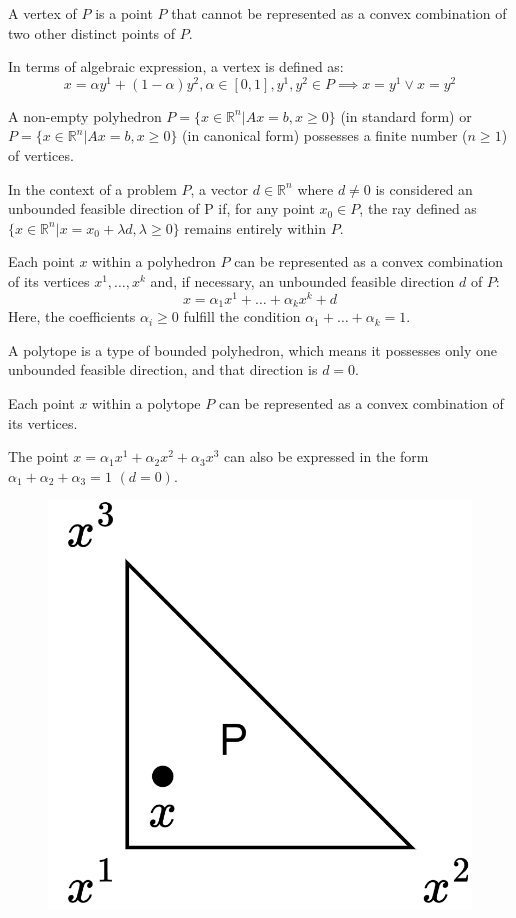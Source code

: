 \begin{definition}
    A vertex of $P$ is a point $P$ that cannot be represented as a convex combination of two other distinct points of $P$. 
\end{definition}
In terms of algebraic expression, a vertex is defined as:
\[x= \alpha y^1+(1-\alpha)y^2, \alpha \in [0,1], y^1,y^2 \in P \implies x=y^1 \lor x=y^2\]
\begin{property}
    A non-empty polyhedron $P=\{x \in \mathbb{R}^n|Ax=b,x \geq 0\}$ (in standard form) or $P=\{x \in \mathbb{R}^n|Ax=b,x \geq 0\}$ (in canonical form) possesses a finite number ($n \geq 1$) of vertices. 
\end{property}
\begin{definition}
    In the context of a problem $P$, a vector $d \in \mathbb{R}^n$ where $d \neq 0$ is considered an unbounded feasible direction of P if, for any  point $x_0 \in P$, the ray defined as $\{x \in \mathbb{R}^n|x=x_0+\lambda d,\lambda \geq 0\}$ remains entirely within $P$.
\end{definition}
\begin{theorem}
    Each point $x$ within a polyhedron $P$ can be represented as a convex combination of its vertices $x^1,\dots,x^k$ and, if necessary, an unbounded feasible direction $d$ of $P$: 
    \[x=\alpha_1x^1+\dots+\alpha_kx^k+d\]
    Here, the coefficients $\alpha_i \geq 0$ fulfill the condition $\alpha_1+\dots+\alpha_k=1$. 
\end{theorem}
\begin{definition}
    A polytope is a type of bounded polyhedron, which means it possesses only one unbounded feasible direction, and that direction is $d=0$. 
\end{definition}
Each point $x$ within a polytope $P$ can be represented as a convex combination of its vertices.
\begin{example}
    The point $x=\alpha_1x^1+\alpha_2x^2+\alpha_3x^3$ can also be expressed in the form $\alpha_1+\alpha_2+\alpha_3=1$ $(d=0)$. 
    \begin{figure}[H]
        \centering
        \includegraphics[width=0.2\linewidth]{images/polytope.png}
    \end{figure}
\end{example}
